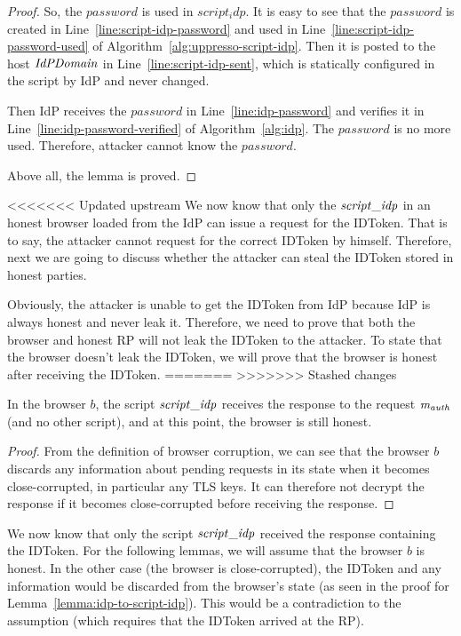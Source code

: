 \begin{theorem}
\begin{proof}
  So, the $password$ is used in $script_idp$. It is easy to see that the $password$ is created in Line~\ref{line:script-idp-password} and used in Line~\ref{line:script-idp-password-used} of Algorithm~\ref{alg:uppresso-script-idp}. Then it is posted to the host $\mathit{IdPDomain}$ in Line~\ref{line:script-idp-sent}, which is statically configured in the script by IdP and never changed. 
  
  Then IdP receives the $password$ in Line~\ref{line:idp-password} and verifies it in Line~\ref{line:idp-password-verified} of Algorithm~\ref{alg:idp}. The $password$ is no more used. Therefore, attacker cannot know the $password$.
  
  Above all, the lemma is proved.
  \end{proof}

<<<<<<< Updated upstream
  We now know that only the $\mathit{script\_idp}$ in an honest browser 
  loaded from the IdP can issue a request for the IDToken. 
  That is to say, the attacker cannot request for the correct IDToken 
  by himself. Therefore, next we are going to discuss whether the attacker
  can steal the IDToken stored in honest parties.

  Obviously, the attacker is unable to get the IDToken from IdP because IdP 
  is always honest and never leak it. Therefore, we need to prove that both 
  the browser and honest RP will not leak the IDToken to the attacker. 
  To state that the browser doesn't leak the IDToken, 
  we will prove that the browser is honest after receiving the IDToken.
=======
>>>>>>> Stashed changes
  
  \begin{lemma} \label{lemma:idp-to-script-idp} %
    In the browser $b$, the script $\mathit{script\_idp}$ receives the response to the request $\mathit{m_{auth}}$ (and no other script), and at this point, the browser is still honest.
  \end{lemma}
  \begin{proof}
    From the definition of browser corruption, we can see that the browser $b$ discards any information about pending requests in its state when it becomes close-corrupted, in particular any TLS keys. It can therefore not decrypt the response if it becomes close-corrupted before receiving the response.
  \end{proof}
  
  We now know that only the script $\mathit{script\_idp}$ received 
  the response containing the IDToken. For the following lemmas, 
  we will assume that the browser $b$ is honest. In the other 
  case (the browser is close-corrupted), the IDToken and any 
  information would be discarded from the browser's state 
  (as seen in the proof for Lemma~\ref{lemma:idp-to-script-idp}). 
  This would be a contradiction to the assumption 
  (which requires that the IDToken arrived at the RP).
  

\end{theorem}
